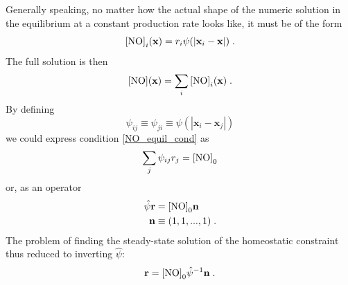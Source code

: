 \documentclass[10pt,letterpaper]{article}
\begin{document}
Generally speaking, no matter how the actual shape of the numeric solution in the equilibrium at a constant production rate looks like, it must be of the form
\begin{equation}
{\rm [NO]}_i(\mathbf{x}) = r_i  \psi (|\mathbf{x}_{i}-\mathbf{x}|) \;  . \label{general_diff_interaction}
\end{equation}
The full solution is then
\begin{equation}
{\rm [NO]}(\mathbf{x}) = \sum_i {\rm [NO]}_i(\mathbf{x})\;.
\label{full_sol_diff_equil}
\end{equation}
By defining
\begin{equation}
\psi_{ij} \equiv \psi_{ji} \equiv \psi (|\mathbf{x}_i-\mathbf{x}_j|)
\label{interact_matrix_elements}
\end{equation}
we could express condition \eqref{NO_equil_cond} as
\begin{equation}
\sum_j \psi_{ij} r_j = {\rm [NO]}_0
\label{NO_equil_cond_interact_matrix}
\end{equation}
or, as an operator
\begin{align}
\hat{\psi}\mathbf{r} &= {\rm [NO]}_0 \mathbf{n} \label{NO_equil_cond_interact_matrix_operator} \\
\mathbf{n}&\equiv (1,1,...,1) \; .
\end{align}
The problem of finding the steady-state solution of the homeostatic constraint thus reduced to inverting $\hat{\psi}$:
\begin{equation}
\mathbf{r} = {\rm [NO]}_0 \hat{\psi}^{-1} \mathbf{n} \; .
\label{NO_euqil_cond_interact_matrix_operator_solve}
\end{equation}
\end{document}
